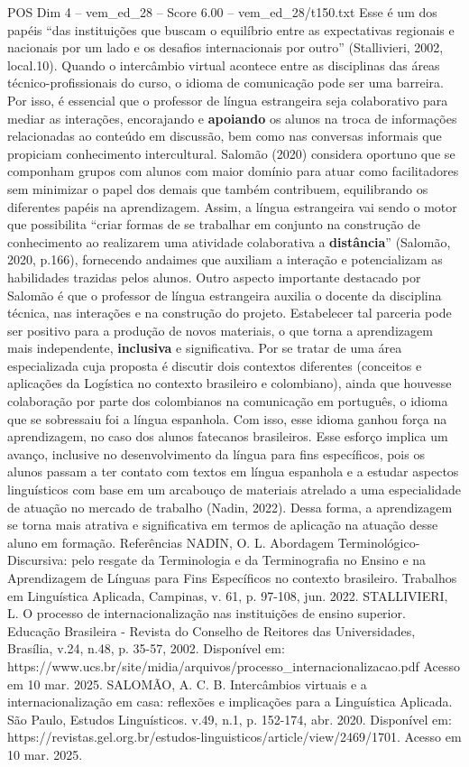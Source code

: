 \begin{textsample}{POS Dim 4 – vem\_ed\_28 – Score 6.00 – vem\_ed\_28/t150.txt}
Esse é um dos papéis “das instituições que buscam o equilíbrio entre as expectativas regionais e nacionais por um lado e os desafios internacionais por outro” (Stallivieri, 2002, local.10).
Quando o intercâmbio virtual acontece entre as disciplinas das áreas técnico-profissionais do curso, o idioma de comunicação pode ser uma barreira.
Por isso, é essencial que o professor de língua estrangeira seja colaborativo para mediar as interações, encorajando e \textbf{apoiando} os alunos na troca de informações relacionadas ao conteúdo em discussão, bem como nas conversas informais que propiciam conhecimento intercultural.
Salomão (2020) considera oportuno que se componham grupos com alunos com maior domínio para atuar como facilitadores sem minimizar o papel dos demais que também contribuem, equilibrando os diferentes papéis na aprendizagem.
Assim, a língua estrangeira vai sendo o motor que possibilita “criar formas de se trabalhar em conjunto na construção de conhecimento ao realizarem uma atividade colaborativa a \textbf{distância}” (Salomão, 2020, p.166), fornecendo andaimes que auxiliam a interação e potencializam as habilidades trazidas pelos alunos.
Outro aspecto importante destacado por Salomão é que o professor de língua estrangeira auxilia o docente da disciplina técnica, nas interações e na construção do projeto.
Estabelecer tal parceria pode ser positivo para a produção de novos materiais, o que torna a aprendizagem mais independente, \textbf{inclusiva} e significativa.
Por se tratar de uma área especializada cuja proposta é discutir dois contextos diferentes (conceitos e aplicações da Logística no contexto brasileiro e colombiano), ainda que houvesse colaboração por parte dos colombianos na comunicação em português, o idioma que se sobressaiu foi a língua espanhola.
Com isso, esse idioma ganhou força na aprendizagem, no caso dos alunos fatecanos brasileiros.
Esse esforço implica um avanço, inclusive no desenvolvimento da língua para fins específicos, pois os alunos passam a ter contato com textos em língua espanhola e a estudar aspectos linguísticos com base em um arcabouço de materiais atrelado a uma especialidade de atuação no mercado de trabalho (Nadin, 2022).
Dessa forma, a aprendizagem se torna mais atrativa e significativa em termos de aplicação na atuação desse aluno em formação.
Referências NADIN, O.
L.
Abordagem Terminológico-Discursiva: pelo resgate da Terminologia e da Terminografia no Ensino e na Aprendizagem de Línguas para Fins Específicos no contexto brasileiro.
Trabalhos em Linguística Aplicada, Campinas, v. 61, p. 97-108, jun. 2022.
STALLIVIERI, L.
O processo de internacionalização nas instituições de ensino superior.
Educação Brasileira - Revista do Conselho de Reitores das Universidades, Brasília, v.24, n.48, p. 35-57, 2002.
Disponível em: https://www.ucs.br/site/midia/arquivos/processo\_internacionalizacao.pdf Acesso em 10 mar. 2025.
SALOMÃO, A.
C.
B.
Intercâmbios virtuais e a internacionalização em casa: reflexões e implicações para a Linguística Aplicada.
São Paulo, Estudos Linguísticos. v.49, n.1, p. 152-174, abr. 2020.
Disponível em: https://revistas.gel.org.br/estudos-linguisticos/article/view/2469/1701.
Acesso em 10 mar. 2025.

\end{textsample}
